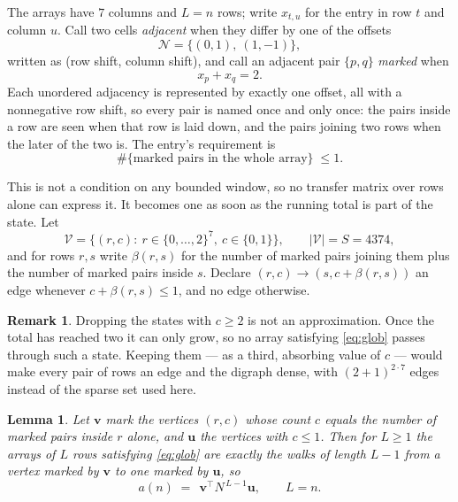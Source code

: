 \documentclass[11pt,a4paper]{article}
\theoremstyle{plain}
\newtheorem{lemma}[theorem]{Lemma}
\theoremstyle{definition}
\newtheorem{remark}[theorem]{Remark}
\begin{document}
The arrays have $7$ columns and $L=n$ rows; write $x_{t,u}$ for the entry in
row $t$ and column $u$. Call two cells \emph{adjacent} when they differ by one of the
offsets
\[
\mathcal N=\{(0,1),\ (1,-1)\},
\]
written as (row shift, column shift), and call an adjacent pair $\{p,q\}$
\emph{marked} when
\[
x_{p}+x_{q}=2 .
\]
Each unordered adjacency is represented by exactly one offset, all with a nonnegative row
shift, so every pair is named once and only once: the pairs inside a row are seen when
that row is laid down, and the pairs joining two rows when the later of the two is. The
entry's requirement is
\begin{equation}\label{eq:glob}
\#\{\text{marked pairs in the whole array}\}\;\le1.
\end{equation}

This is not a condition on any bounded window, so no transfer matrix over rows alone can
express it. It becomes one as soon as the running total is part of the state. Let
\[
\mathcal V=\bigl\{(r,c):\ r\in\{0,\dots,2\}^{7},\ c\in\{0,1\}\bigr\},
\qquad |\mathcal V|=S=4374,
\]
and for rows $r,s$ write $\beta(r,s)$ for the number of marked pairs joining them plus the
number of marked pairs inside $s$. Declare $(r,c)\to(s,c+\beta(r,s))$ an edge whenever
$c+\beta(r,s)\le1$, and no edge otherwise.

\begin{remark}
Dropping the states with $c\ge2$ is not an approximation. Once the total has reached two it
can only grow, so no array satisfying \eqref{eq:glob} passes through such a state. Keeping
them --- as a third, absorbing value of $c$ --- would make every pair of rows an edge and
the digraph dense, with $(2+1)^{2\cdot7}$ edges instead of the sparse set used here.
\end{remark}

\begin{lemma}\label{lem:walk}
Let $\mathbf{v}$ mark the vertices $(r,c)$ whose count $c$ equals the number of marked pairs
inside $r$ alone, and $\mathbf{u}$ the vertices with $c\le1$. Then for $L\ge1$ the arrays
of $L$ rows satisfying \eqref{eq:glob} are exactly the walks of length $L-1$ from a
vertex marked by $\mathbf{v}$ to one marked by $\mathbf{u}$, so
\[
a(n)\;=\;\,\mathbf{v}^{\!\top}N^{\,L-1}\mathbf{u},\qquad L=n .
\]
\end{lemma}
\end{document}

